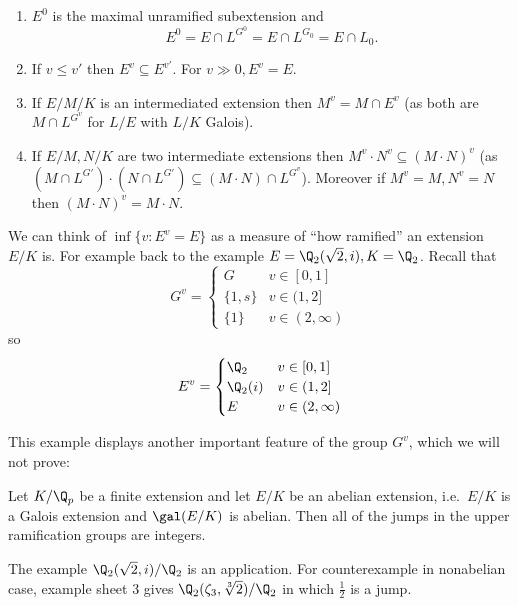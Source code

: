 \documentclass[a4paper]{article}
\begin{document}
\begin{proposition}\leavevmode
  \begin{enumerate}
  \item \(E^0\) is the maximal unramified subextension and
    \[
      E^0 = E \cap L^{G^0} = E \cap L^{G_0} = E \cap L_0.
    \]
  \item If \(v \leq v'\) then \(E^v \subseteq E^{v'}\). For \(v \gg 0, E^v = E\).
  \item If \(E/M/K\) is an intermediated extension then \(M^v = M \cap E^v\) (as both are \(M \cap L^{G^v}\) for \(L/E\) with \(L/K\) Galois).
  \item If \(E/M, N/K\) are two intermediate extensions then \(M^v \cdot N^v \subseteq (M\cdot N)^v\) (as \((M \cap L^{G'}) \cdot (N \cap L^{G'}) \subseteq (M \cdot N) \cap L^{G^v}\)). Moreover if \(M^v = M, N^v = N\) then \((M \cdot N)^v = M \cdot N\).
  \end{enumerate}
\end{proposition}

We can think of \(\inf\{v: E^v = E\}\) as a measure of ``how ramified'' an extension \(E/K\) is. For example back to the example \(E = \Q_2(\sqrt 2, i), K = \Q_2\). Recall that
\[
  G^v =
  \begin{cases}
    G & v \in [0, 1] \\
    \{1, s\} & v \in (1, 2] \\
    \{1\} & v \in (2, \infty)
  \end{cases}
\]
so
\[
  E^v =
  \begin{cases}
    \Q_2 & v \in [0, 1] \\
    \Q_2(i) & v \in (1, 2] \\
    E & v \in (2, \infty)
  \end{cases}
\]

This example displays another important feature of the group \(G^v\), which we will not prove:

\begin{theorem}
  Let \(K/\Q_p\) be a finite extension and let \(E/K\) be an abelian extension, i.e.\ \(E/K\) is a Galois extension and \(\gal(E/K)\) is abelian. Then all of the jumps in the upper ramification groups are integers.
\end{theorem}

The example \(\Q_2(\sqrt 2, i)/\Q_2\) is an application. For counterexample in nonabelian case, example sheet 3 gives \(\Q_2(\zeta_3, \sqrt[3]{2})/\Q_2\) in which \(\frac{1}{2}\) is a jump.
\end{document}
